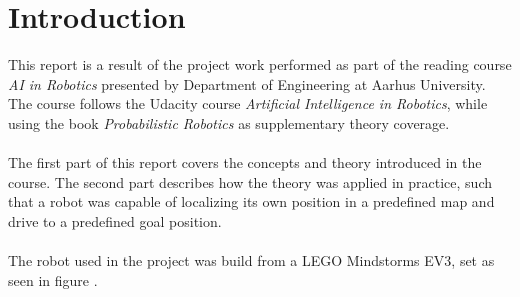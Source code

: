 \chapter{Introduction}
\label{chp:intro}

This report is a result of the project work performed as part of the reading course \emph{AI in Robotics} presented by Department of Engineering at Aarhus University.
The course follows the Udacity course \emph{Artificial Intelligence in Robotics}, while using the book \emph{Probabilistic Robotics} \citep{AIbook} as supplementary theory coverage.\\\\
The first part of this report covers the concepts and theory introduced in the course.
The second part describes how the theory was applied in practice, such that a robot was capable of localizing its own position in a predefined map and drive to a predefined goal position.\\\\
The robot used in the project was build from a LEGO Mindstorms EV3, set as seen in figure .
